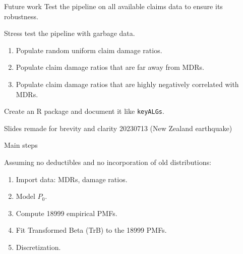 \documentclass[aspectratio=169]{beamer}
\begin{document}
\begin{frame}{Future work}
Test the pipeline on all available claims data to ensure its robustness.\medskip

Stress test the pipeline with garbage data.\medskip

\begin{enumerate}
\item Populate random uniform claim damage ratios.\medskip

\item Populate claim damage ratios that are far away from MDRs.\medskip

\item Populate claim damage ratios that are highly negatively correlated with MDRs.\medskip

\end{enumerate}
 

Create an R package and document it like \texttt{keyALGs}. 
\end{frame}


\begin{frame}
\Huge \centering Slides remade for brevity and clarity 20230713 (New Zealand earthquake)
\end{frame}

\begin{frame}{Main steps}

Assuming no deductibles and no incorporation of old distributions:\medskip

\begin{enumerate}
\item Import data: MDRs, damage ratios.\medskip

\item Model $P_0$.\medskip

\item Compute 18999 empirical PMFs.\medskip

\item Fit Transformed Beta (TrB) to the 18999 PMFs.\medskip

\item Discretization.
\end{enumerate}
\end{frame}
\end{document}
